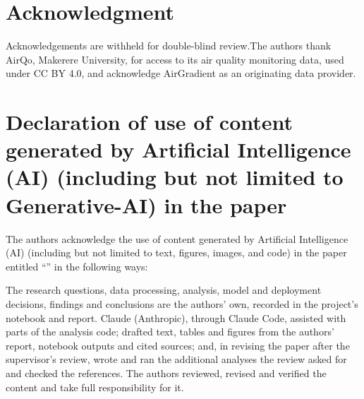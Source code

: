 \documentclass{ieeeaccess}
\begin{document}
\section*{Acknowledgment}

\ifblind Acknowledgements are withheld for double-blind review.\else The authors thank AirQo, Makerere University, for access to its air quality monitoring data, used under CC BY 4.0, and acknowledge AirGradient as an originating data provider.\fi

\section*{Declaration of use of content generated by Artificial Intelligence (AI) (including but not limited to Generative-AI) in the paper}

The authors acknowledge the use of content generated by Artificial Intelligence (AI) (including but not limited to text, figures, images, and code) in the paper entitled ``\papertitle'' in the following ways:

The research questions, data processing, analysis, model and deployment decisions, findings and conclusions are the authors' own, recorded in the project's notebook and report. Claude (Anthropic), through Claude Code, assisted with parts of the analysis code; drafted text, tables and figures from the authors' report, notebook outputs and cited sources; and, in revising the paper after the supervisor's review, wrote and ran the additional analyses the review asked for and checked the references. The authors reviewed, revised and verified the content and take full responsibility for it.




\EOD
\end{document}
